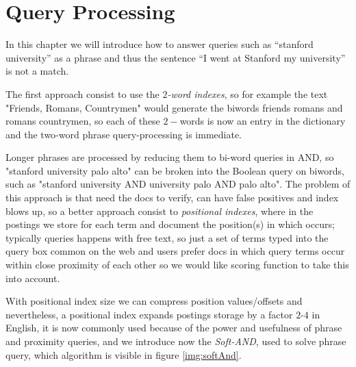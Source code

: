 \chapter{Query Processing}
In this chapter we will introduce how to answer queries such as “stanford university” as a phrase and 
thus the sentence “I went at Stanford my university” is not a match.

The first approach consist to use the \emph{$2$-word indexes}, so for example the text "Friends, Romans, Countrymen" would generate the biwords
friends romans and romans countrymen, so each of these $2-$words is now an entry in the dictionary and the two-word phrase query-processing is immediate.

Longer phrases are processed by reducing them to bi-word queries in AND, so "stanford university palo alto"
can be broken into the Boolean query on biwords, such as "stanford university AND university palo AND palo alto".\newline
The problem of this approach is that need the docs to verify, can have false positives and index blows up, so a better approach consist to \emph{positional indexes},
where in the postings we store for each term and  document the position(s) in which occurs; typically queries happens with free text,
so just a set of terms typed into the query box common on the web and users prefer docs in which query terms
occur within close proximity of each other so we would like scoring function to take this into account.

With positional index size we can compress position values/offsets and nevertheless, a positional index expands
postings storage by a factor $2$-$4$ in English, it is now commonly used because of the power and usefulness of phrase and proximity queries, 
and we introduce now the \emph{Soft-AND}, used to solve phrase query, which algorithm is visible in figure \ref{img:softAnd}.

